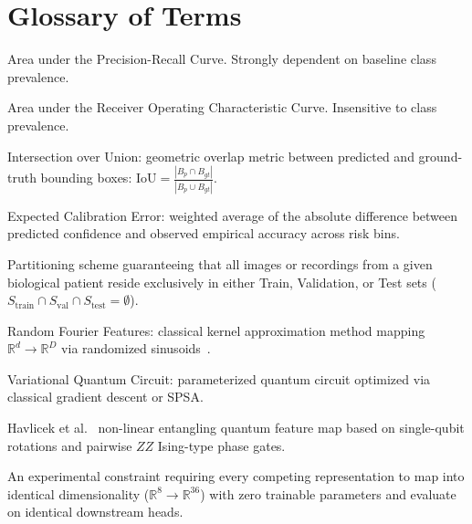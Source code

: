 \documentclass[11pt,a4paper]{report}
\begin{document}
\section*{Glossary of Terms}
\begin{description}[leftmargin=3.5cm,style=nextline]
  \item[PR-AUC] Area under the Precision-Recall Curve. Strongly dependent on baseline class prevalence.
  \item[ROC-AUC] Area under the Receiver Operating Characteristic Curve. Insensitive to class prevalence.
  \item[IoU] Intersection over Union: geometric overlap metric between predicted and ground-truth bounding boxes: $\text{IoU} = \frac{|B_p \cap B_{gt}|}{|B_p \cup B_{gt}|}$.
  \item[ECE] Expected Calibration Error: weighted average of the absolute difference between predicted confidence and observed empirical accuracy across risk bins.
  \item[Patient-Disjoint] Partitioning scheme guaranteeing that all images or recordings from a given biological patient reside exclusively in either Train, Validation, or Test sets ($S_\text{train} \cap S_\text{val} \cap S_\text{test} = \emptyset$).
  \item[RFF] Random Fourier Features: classical kernel approximation method mapping $\mathbb{R}^d \to \mathbb{R}^D$ via randomized sinusoids~\cite{rahimi2007random}.
  \item[VQC] Variational Quantum Circuit: parameterized quantum circuit optimized via classical gradient descent or SPSA.
  \item[ZZ Feature Map] Havlicek et al.~\cite{havlicek2019supervised} non-linear entangling quantum feature map based on single-qubit rotations and pairwise $ZZ$ Ising-type phase gates.
  \item[Same-Shape Contract] An experimental constraint requiring every competing representation to map into identical dimensionality ($\mathbb{R}^8 \to \mathbb{R}^{36}$) with zero trainable parameters and evaluate on identical downstream heads.
\end{description}
\end{document}
